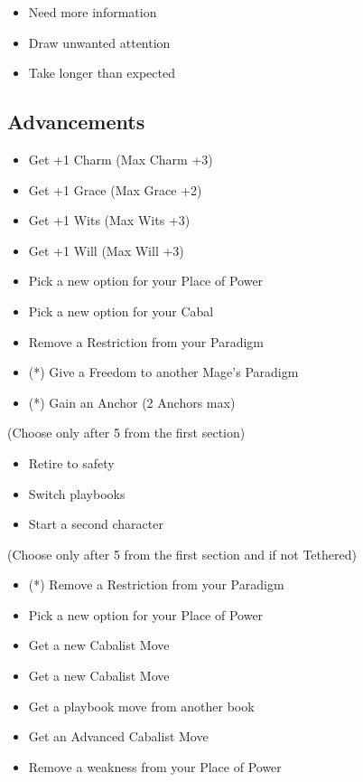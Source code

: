 \documentclass[10pt,twoside,openright]{memoir}
\begin{document}
\begin{itemize}
\tightlist
\item
  Need more information
\item
  Draw unwanted attention
\item
  Take longer than expected
\end{itemize}

\hypertarget{advancements}{%
\subsection{Advancements}\label{advancements}}

\begin{itemize}
\tightlist
\item
  Get +1 Charm (Max Charm +3)
\item
  Get +1 Grace (Max Grace +2)
\item
  Get +1 Wits (Max Wits +3)
\item
  Get +1 Will (Max Will +3)
\item
  Pick a new option for your Place of Power
\item
  Pick a new option for your Cabal
\item
  Remove a Restriction from your Paradigm
\item
  (*) Give a Freedom to another Mage's Paradigm
\item
  (*) Gain an Anchor (2 Anchors max)
\end{itemize}

(Choose only after 5 from the first section)

\begin{itemize}
\tightlist
\item
  Retire to safety
\item
  Switch playbooks
\item
  Start a second character
\end{itemize}

(Choose only after 5 from the first section and if not Tethered)

\begin{itemize}
\tightlist
\item
  (*) Remove a Restriction from your Paradigm
\item
  Pick a new option for your Place of Power
\item
  Get a new Cabalist Move
\item
  Get a new Cabalist Move
\item
  Get a playbook move from another book
\item
  Get an Advanced Cabalist Move
\item
  Remove a weakness from your Place of Power
\end{itemize}
\end{document}
